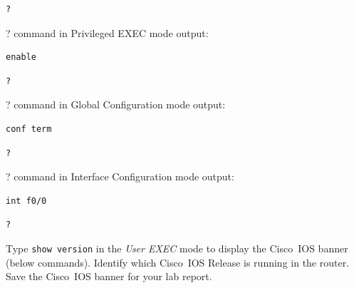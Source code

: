 \documentclass{UTNetLab}
\begin{document}
	\begin{lstlisting}[frame=trBL]
	?
	\end{lstlisting}
	
	? command in Privileged EXEC mode output:
	
	\begin{lstlisting}[frame=trBL]
	enable
	\end{lstlisting}
	
	\begin{lstlisting}[frame=trBL]
	?
	\end{lstlisting}
	
	? command in Global Configuration mode output:
	
	\begin{lstlisting}[frame=trBL]
	conf term
	\end{lstlisting}
	
	\begin{lstlisting}[frame=trBL]
	?
	\end{lstlisting}
	
	? command in Interface Configuration mode output:
	
	
	\begin{lstlisting}[frame=trBL]
	int f0/0
	\end{lstlisting}
	
	\begin{lstlisting}[frame=trBL]
	?
	\end{lstlisting}

    Type \lstinline[language={cisco}]{show version} in the \textit{User EXEC} mode to display the Cisco~IOS banner (below commands).
    Identify which Cisco~IOS Release is running in the router.
    Save the Cisco~IOS banner for your lab report.
    
    
    
\end{document}
